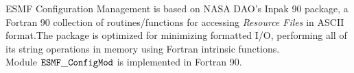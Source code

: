 

      ESMF Configuration Management is based on NASA DAO's 
      Inpak 90 package, a Fortran 90 collection of routines/functions
      for accessing {\em Resource Files} in ASCII format.The package 
      is optimized for minimizing formatted I/O, performing all of its 
      string operations in memory using Fortran intrinsic functions.\\

      Module ${\tt ESMF\_ConfigMod}$ is implemented in Fortran 90.



